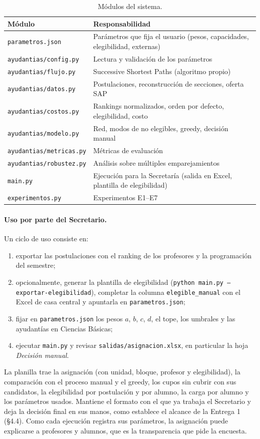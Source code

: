 \documentclass{article}
\begin{document}
\begin{table}[H]
\centering
\small
\begin{tabular}{ll}
\toprule
\textbf{Módulo} & \textbf{Responsabilidad} \\
\midrule
\texttt{parametros.json} & Parámetros que fija el usuario (pesos, capacidades, elegibilidad, externas) \\
\texttt{ayudantias/config.py} & Lectura y validación de los parámetros \\
\texttt{ayudantias/flujo.py} & Successive Shortest Paths (algoritmo propio) \\
\texttt{ayudantias/datos.py} & Postulaciones, reconstrucción de secciones, oferta SAP \\
\texttt{ayudantias/costos.py} & Rankings normalizados, orden por defecto, elegibilidad, costo \\
\texttt{ayudantias/modelo.py} & Red, modos de no elegibles, greedy, decisión manual \\
\texttt{ayudantias/metricas.py} & Métricas de evaluación \\
\texttt{ayudantias/robustez.py} & Análisis sobre múltiples emparejamientos \\
\texttt{main.py} & Ejecución para la Secretaría (salida en Excel, plantilla de elegibilidad) \\
\texttt{experimentos.py} & Experimentos E1--E7 \\
\bottomrule
\end{tabular}
\caption{Módulos del sistema.}
\label{tab:modulos}
\end{table}

\paragraph{Uso por parte del Secretario.} Un ciclo de uso consiste en:
\begin{enumerate}
    \item exportar las postulaciones con el ranking de los profesores y la programación del semestre;
    \item opcionalmente, generar la plantilla de elegibilidad (\texttt{python main.py --exportar-elegibilidad}), completar la columna \texttt{elegible\_manual} con el Excel de casa central y apuntarla en \texttt{parametros.json};
    \item fijar en \texttt{parametros.json} los pesos $a$, $b$, $c$, $d$, el tope, los umbrales y las ayudantías en Ciencias Básicas;
    \item ejecutar \texttt{main.py} y revisar \texttt{salidas/asignacion.xlsx}, en particular la hoja \emph{Decisión manual}.
\end{enumerate}
La planilla trae la asignación (con unidad, bloque, profesor y elegibilidad), la comparación con el proceso manual y el greedy, los cupos sin cubrir con sus candidatos, la elegibilidad por postulación y por alumno, la carga por alumno y los parámetros usados. Mantiene el formato con el que ya trabaja el Secretario y deja la decisión final en sus manos, como establece el alcance de la Entrega 1 (§4.4). Como cada ejecución registra sus parámetros, la asignación puede explicarse a profesores y alumnos, que es la transparencia que pide la encuesta.
\end{document}
